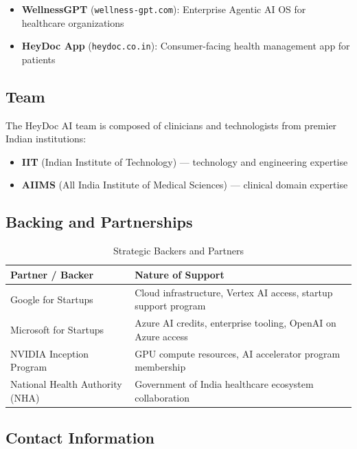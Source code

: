 \documentclass[12pt,a4paper]{article}
\begin{document}
\begin{itemize}
    \item \textbf{WellnessGPT} (\texttt{wellness-gpt.com}): Enterprise Agentic AI OS for healthcare organizations
    \item \textbf{HeyDoc App} (\texttt{heydoc.co.in}): Consumer-facing health management app for patients
\end{itemize}

\subsection{Team}

The HeyDoc AI team is composed of clinicians and technologists from premier Indian institutions:
\begin{itemize}[noitemsep]
    \item \textbf{IIT} (Indian Institute of Technology) — technology and engineering expertise
    \item \textbf{AIIMS} (All India Institute of Medical Sciences) — clinical domain expertise
\end{itemize}

\subsection{Backing and Partnerships}

\begin{table}[H]
\centering
\renewcommand{\arraystretch}{1.4}
\begin{tabularx}{\textwidth}{lX}
\toprule
\textbf{Partner / Backer} & \textbf{Nature of Support} \\
\midrule
Google for Startups      & Cloud infrastructure, Vertex AI access, startup support program \\
Microsoft for Startups   & Azure AI credits, enterprise tooling, OpenAI on Azure access \\
NVIDIA Inception Program & GPU compute resources, AI accelerator program membership \\
National Health Authority (NHA) & Government of India healthcare ecosystem collaboration \\
\bottomrule
\end{tabularx}
\caption{Strategic Backers and Partners}
\end{table}

\subsection{Contact Information}
\end{document}
